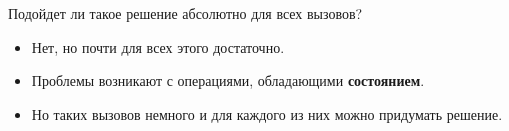 \begin{frame}
\frametitle{\insertsection} 
\framesubtitle{\insertsubsection}
Подойдет ли такое решение абсолютно для всех вызовов?
\begin{itemize}
	\item Нет, но почти для всех этого достаточно.
	\item Проблемы возникают с операциями, обладающими \textbf{состоянием}.
	\item Но таких вызовов немного и для каждого из них можно придумать решение.
\end{itemize}
\end{frame}
